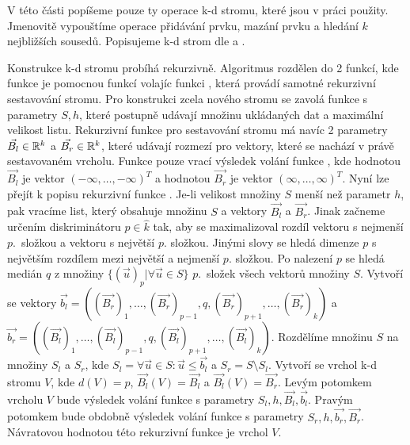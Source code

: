 V této části popíšeme pouze ty operace k-d stromu, které jsou v práci použity. Jmenovitě vypouštíme operace přidávání prvku, mazání prvku a hledání $k$ nejbližších sousedů. Popisujeme k-d strom dle \cite{kd-tree} a \cite{kd-tree-optimized}.

Konstrukce k-d stromu probíhá rekurzivně. Algoritmus rozdělen do 2 funkcí, kde funkce  je pomocnou funkcí volajíc funkci , která provádí samotné rekurzivní sestavování stromu. Pro konstrukci zcela nového stromu se zavolá funkce  s parametry $S, h$, které postupně udávají množinu ukládaných dat a maximální velikost listu. Rekurzivní funkce  pro sestavování stromu má navíc 2 parametry $\vec{B_l} \in \mathbb{R}^k$ a $\vec{B_r} \in \mathbb{R}^k$, které udávají rozmezí pro vektory, které se nachází v právě sestavovaném vrcholu. Funkce  pouze vrací výsledek volání funkce , kde hodnotou $\vec{B_l}$ je vektor $(-\infty, \ldots, -\infty)^T$ a hodnotou $\vec{B_r}$ je vektor $(\infty, \ldots, \infty)^T$. Nyní lze přejít k popisu rekurzivní funkce . Je-li velikost množiny $S$ menší než parametr $h$, pak vracíme list, který obsahuje množinu $S$ a vektory $\vec{B_l}$ a $\vec{B_r}$. Jinak začneme určením diskriminátoru $p \in \hat k$ tak, aby se maximalizoval rozdíl vektoru s nejmenší $p.$~složkou a vektoru s největší $p.$ složkou. Jinými slovy se hledá dimenze $p$ s největším rozdílem mezi největší a nejmenší $p.$ složkou. Po nalezení $p$ se hledá medián $q$ z množiny $\{(\vec{u})_p | \forall \vec{u} \in S\}$ $p.$~složek všech vektorů množiny $S$. Vytvoří se vektory $\vec{b_l} = ((\vec{B_r})_1, \ldots, (\vec{B_r})_{p-1}, q, (\vec{B_r})_{p+1}, \ldots, (\vec{B_r})_k)$ a $\vec{b_r} = ((\vec{B_l})_1, \ldots, (\vec{B_l})_{p-1}, q, (\vec{B_l})_{p+1}, \ldots, (\vec{B_l})_k)$. Rozdělíme množinu $S$ na množiny $S_l$ a $S_r$, kde $S_l = {\forall\vec{u} \in S: \vec{u} \leq \vec{b_l}}$ a $S_r = S \setminus S_l$. Vytvoří se vrchol k-d stromu $V$, kde $d(V) = p$, $\vec{B_l}(V) = \vec{B_l}$ a $\vec{B_l}(V) = \vec{B_r}$. Levým potomkem vrcholu $V$ bude výsledek volání funkce  s parametry $S_l, h, \vec{B_l}, \vec{b_l}$. Pravým potomkem bude obdobně výsledek volání funkce  s parametry $S_r, h, \vec{b_r}, \vec{B_r}$. Návratovou hodnotou této rekurzivní funkce je vrchol $V$.

